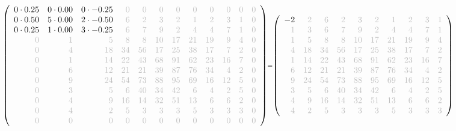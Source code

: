 \documentclass[11pt]{article}
\begin{document}
    \[\scriptstyle \def\g{\color{lightgray}}\left(\begin{array}{rrrrrrrrrrrr}0\cdot 0.25 & 0\cdot 0.00 & 0\cdot -0.25 & \g{0} & \g{0} & \g{0} & \g{0} & \g{0} & \g{0} & \g{0} & \g{0} & \g{0}\\0\cdot 0.50 & 5\cdot 0.00 & 2\cdot -0.50 & \g{6} & \g{2} & \g{3} & \g{2} & \g{1} & \g{2} & \g{3} & \g{1} & \g{0}\\0\cdot 0.25 & 1\cdot 0.00 & 3\cdot -0.25 & \g{6} & \g{7} & \g{9} & \g{2} & \g{4} & \g{4} & \g{7} & \g{1} & \g{0}\\\g{0} & \g{1} & \g{5} & \g{8} & \g{8} & \g{10} & \g{17} & \g{21} & \g{19} & \g{9} & \g{4} & \g{0}\\\g{0} & \g{4} & \g{18} & \g{34} & \g{56} & \g{17} & \g{25} & \g{38} & \g{17} & \g{7} & \g{2} & \g{0}\\\g{0} & \g{1} & \g{14} & \g{22} & \g{43} & \g{68} & \g{91} & \g{62} & \g{23} & \g{16} & \g{7} & \g{0}\\\g{0} & \g{6} & \g{12} & \g{21} & \g{21} & \g{39} & \g{87} & \g{76} & \g{34} & \g{4} & \g{2} & \g{0}\\\g{0} & \g{9} & \g{24} & \g{54} & \g{73} & \g{88} & \g{95} & \g{69} & \g{16} & \g{12} & \g{5} & \g{0}\\\g{0} & \g{3} & \g{5} & \g{6} & \g{40} & \g{34} & \g{42} & \g{6} & \g{4} & \g{2} & \g{5} & \g{0}\\\g{0} & \g{4} & \g{9} & \g{16} & \g{14} & \g{32} & \g{51} & \g{13} & \g{6} & \g{6} & \g{2} & \g{0}\\\g{0} & \g{4} & \g{2} & \g{5} & \g{3} & \g{3} & \g{3} & \g{5} & \g{3} & \g{3} & \g{3} & \g{0}\\\g{0} & \g{0} & \g{0} & \g{0} & \g{0} & \g{0} & \g{0} & \g{0} & \g{0} & \g{0} & \g{0} & \g{0}\end{array}\right)=\left(\begin{array}{rrrrrrrrrrrr}-2 & \g{2} & \g{6} & \g{2} & \g{3} & \g{2} & \g{1} & \g{2} & \g{3} & \g{1}\\\g{1} & \g{3} & \g{6} & \g{7} & \g{9} & \g{2} & \g{4} & \g{4} & \g{7} & \g{1}\\\g{1} & \g{5} & \g{8} & \g{8} & \g{10} & \g{17} & \g{21} & \g{19} & \g{9} & \g{4}\\\g{4} & \g{18} & \g{34} & \g{56} & \g{17} & \g{25} & \g{38} & \g{17} & \g{7} & \g{2}\\\g{1} & \g{14} & \g{22} & \g{43} & \g{68} & \g{91} & \g{62} & \g{23} & \g{16} & \g{7}\\\g{6} & \g{12} & \g{21} & \g{21} & \g{39} & \g{87} & \g{76} & \g{34} & \g{4} & \g{2}\\\g{9} & \g{24} & \g{54} & \g{73} & \g{88} & \g{95} & \g{69} & \g{16} & \g{12} & \g{5}\\\g{3} & \g{5} & \g{6} & \g{40} & \g{34} & \g{42} & \g{6} & \g{4} & \g{2} & \g{5}\\\g{4} & \g{9} & \g{16} & \g{14} & \g{32} & \g{51} & \g{13} & \g{6} & \g{6} & \g{2}\\\g{4} & \g{2} & \g{5} & \g{3} & \g{3} & \g{3} & \g{5} & \g{3} & \g{3} & \g{3}\end{array}\right)\]
\end{document}
